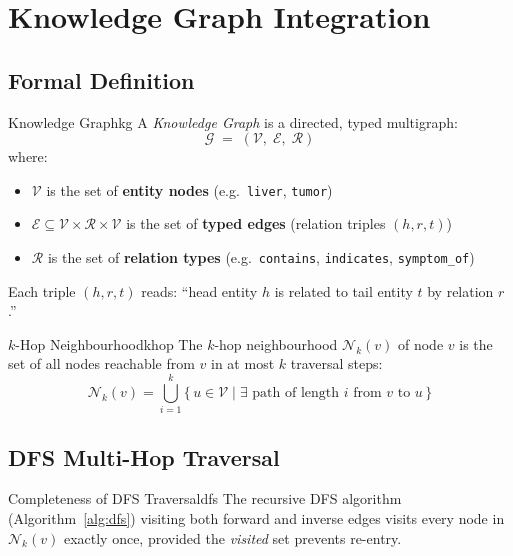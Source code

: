 \documentclass[12pt,a4paper]{article}
\newcommand{\kg}{\mathcal{G}}
\newcommand{\kgV}{\mathcal{V}}
\newcommand{\kgE}{\mathcal{E}}
\newcommand{\kgR}{\mathcal{R}}
\begin{document}
\section{Knowledge Graph Integration}

\subsection{Formal Definition}

\begin{definition}{Knowledge Graph}{kg}
A \emph{Knowledge Graph} is a directed, typed multigraph:
\[
  \kg \;=\; (\kgV,\;\kgE,\;\kgR)
\]
where:
\begin{itemize}
  \item $\kgV$ is the set of \textbf{entity nodes} (e.g.\ \texttt{liver}, \texttt{tumor})
  \item $\kgE \subseteq \kgV \times \kgR \times \kgV$ is the set of \textbf{typed edges}
        (relation triples $(h, r, t)$)
  \item $\kgR$ is the set of \textbf{relation types}
        (e.g.\ \texttt{contains}, \texttt{indicates}, \texttt{symptom\_of})
\end{itemize}
Each triple $(h, r, t)$ reads: ``head entity $h$ is related to tail entity $t$ by
relation $r$.''
\end{definition}

\begin{definition}{$k$-Hop Neighbourhood}{khop}
The $k$-hop neighbourhood $\mathcal{N}_k(v)$ of node $v$ is the set of all nodes
reachable from $v$ in at most $k$ traversal steps:
\[
  \mathcal{N}_k(v) = \bigcup_{i=1}^{k}
    \bigl\{\,u \in \kgV \mid \exists \text{ path of length } i
    \text{ from } v \text{ to } u\,\bigr\}
\]
\end{definition}

\subsection{DFS Multi-Hop Traversal}

\begin{theorem}{Completeness of DFS Traversal}{dfs}
The recursive DFS algorithm \textup{(Algorithm~\ref{alg:dfs})} visiting both forward
and inverse edges visits every node in $\mathcal{N}_k(v)$ exactly once, provided the
\emph{visited} set prevents re-entry.
\end{theorem}
\end{document}
